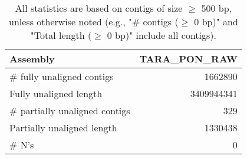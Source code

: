 \documentclass[12pt,a4paper]{article}
\begin{document}
\begin{table}[ht]
\begin{center}
\caption{All statistics are based on contigs of size $\geq$ 500 bp, unless otherwise noted (e.g., "\# contigs ($\geq$ 0 bp)" and "Total length ($\geq$ 0 bp)" include all contigs).}
\begin{tabular}{|l*{1}{|r}|}
\hline
Assembly & TARA\_PON\_RAW \\ \hline
\# fully unaligned contigs & 1662890 \\ \hline
Fully unaligned length & 3409944341 \\ \hline
\# partially unaligned contigs & 329 \\ \hline
Partially unaligned length & 1330438 \\ \hline
\# N's & 0 \\ \hline
\end{tabular}
\end{center}
\end{table}
\end{document}
